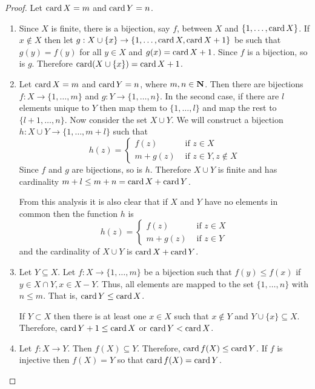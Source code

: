 \begin{proof}
Let $\operatorname{card} X = m$ and $\operatorname{card} Y = n$.
\begin{enumerate}
\item Since $X$ is finite, there is a bijection, say $f$, between $X$ and 
$\{1, \ldots, \operatorname{card} X\}$. If $x \notin X$ then let $g: X \cup \{x\} 
\rightarrow \{1, \ldots, \operatorname{card} X, \operatorname{card} X + 1\}$ be such that $g(y) = f(y)$
for all $y \in X$ and $g(x) = \operatorname{card}{X} + 1$. Since $f$ is a bijection, so
is $g$. Therefore $\operatorname{card}(X \cup \{x\}) = \operatorname{card} X + 1$.

\item Let $\operatorname{card} X = m$ and $\operatorname{card} Y = n$, where $m, n \in \mathbf{N}$. Then
there are bijections $f: X \rightarrow \{1, \ldots, m\}$ and $g: Y 
\rightarrow \{1, \ldots, n\}$. In the second case, if there are $l$ 
elements unique to $Y$ then map them to $\{1, \ldots, l\}$ and map the 
rest to $\{l + 1, \ldots, n\}$. Now consider the set $X \cup Y$. We will 
construct a bijection $h: X \cup Y \rightarrow \{1, \ldots, m + l\}$ such 
that 
\[
h(z) = \begin{cases}
f(z) & \text{ if } z \in X \\
m + g(z) & \text{ if } z \in Y, z \notin X
\end{cases}
\]
Since $f$ and $g$ are bijections, so is $h$. Therefore $X \cup Y$ is finite
and has cardinality $m + l \le m + n = \operatorname{card} X + \operatorname{card} Y$.

From this analysis it is also clear that if $X$ and $Y$ have no elements
in common then the function $h$ is
\[
h(z) = \begin{cases}
f(z) & \text{ if } z \in X \\
m + g(z) & \text{ if } z \in Y
\end{cases}
\]
and the cardinality of $X \cup Y$ is $\operatorname{card} X + \operatorname{card} Y$.

\item Let $Y \subseteq X$. Let $f: X \rightarrow \{1, \ldots, m\}$ be
a bijection such that $f(y) \le f(x)$ if $y \in X \cap Y, x \in X - Y$.
Thus, all elements are mapped to the set $\{1, \ldots, n\}$ with $n \le m$.
That is, $\operatorname{card} Y \le \operatorname{card} X$. 

If $Y \subset X$ then there is at least one $x \in X$ such that $x \notin
Y$ and $Y \cup \{x\} \subseteq X$. Therefore, $\operatorname{card} Y + 1 \le \operatorname{card} X$
or $\operatorname{card} Y < \operatorname{card} X$.

\item Let $f: X \rightarrow Y$. Then $f(X) \subseteq Y$. Therefore, $\operatorname{card}
f(X) \le \operatorname{card} Y$. If $f$ is injective then $f(X) = Y$ so that $\operatorname{card} f(X)
= \operatorname{card} Y$.


\end{enumerate}
\end{proof}
